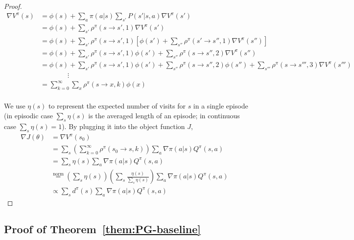 \begin{proof}
{\footnotesize
    \begin{equation} 
        \begin{aligned}
            \nabla V^{\pi}(s) &=\phi(s) +\sum_a \pi(a|s) \sum_{s'}P(s'|s, a)\nabla V^\pi(s') \\
            &= \phi(s) + \sum_{s'}\rho^\pi(s \rightarrow s', 1) \nabla V^\pi(s') \\
            &= \phi(s) + \sum_{s'}\rho^\pi(s \rightarrow s', 1)\left[\phi(s') + \sum_{s''}\rho^\pi(s' \rightarrow s'', 1) \nabla V^\pi(s'')\right] \\
            &= \phi(s) + \sum_{s'}\rho^\pi(s \rightarrow s', 1) \phi(s') + \sum_{s''}\rho^\pi(s \rightarrow s'', 2) \nabla V^\pi(s'')  \\
            &= \phi(s) + \sum_{s'}\rho^\pi(s \rightarrow s', 1) \phi(s') + 
             \sum_{s''}\rho^\pi(s \rightarrow s'', 2) \phi(s'') +
            \sum_{s'''}\rho^\pi(s \rightarrow s''', 3) \nabla V^\pi(s''')  \\
            & \qquad \qquad \vdots \\
            &= \sum_{k=0}^{\infty}\sum_{x}\rho^\pi(s\rightarrow x, k)\phi(x)\\
        \end{aligned}\nonumber
    \end{equation}
}

We use $\eta(s)$ to represent the expected number of visits for $s$ in a single episode (in episodic case $\sum_s \eta(s)$ is the averaged length of an episode; in continuous case $\sum_s \eta(s)=1$). By plugging it into the object function $J$,
\begin{equation}
    \begin{aligned}
        \nabla J(\theta) &= \nabla V^\pi (s_0)   \\
        &= \sum_s \left( \sum_{k=0}^\infty \rho^\pi(s_0 \rightarrow s, k) \right) \sum_a \nabla\pi(a|s) Q^\pi (s,a) & \\
        &= \sum_s \eta(s) \sum_a \nabla\pi(a|s) Q^\pi (s,a)  \\
        &\stackrel{\text{norm}}{=} \left(\sum_s \eta(s) \right) \left(\sum_s \frac{\eta(s)}{\sum_s \eta(s)} \right )\sum_a \nabla\pi(a|s) Q^\pi (s,a) \\
        &\propto \sum_s d^\pi(s)\sum_a \nabla\pi(a|s) Q^\pi (s,a)
    \end{aligned}\nonumber
\end{equation}
\end{proof}

\subsection{Proof of Theorem~\ref{them:PG-baseline}}

